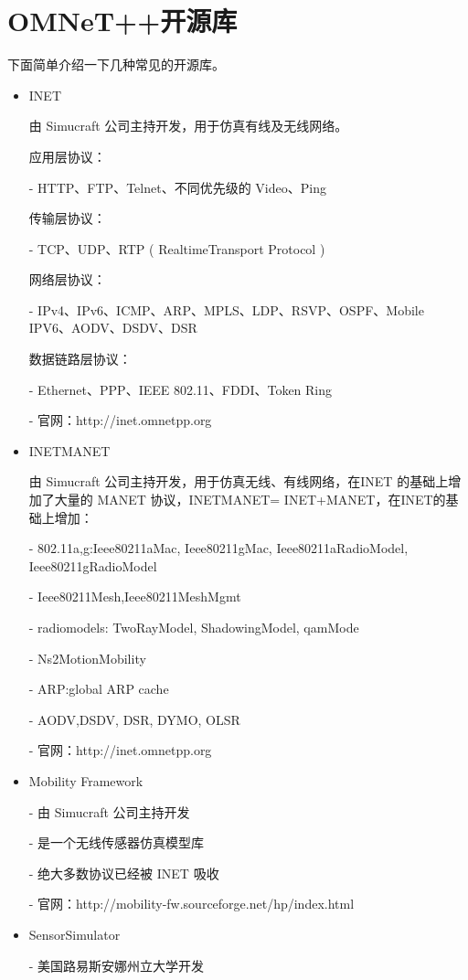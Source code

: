 \section{OMNeT++开源库}

下面简单介绍一下几种常见的开源库。


\begin{itemize}
\item INET

由 Simucraft 公司主持开发，用于仿真有线及无线网络。

应用层协议：

- HTTP、FTP、Telnet、不同优先级的 Video、Ping

传输层协议：

- TCP、UDP、RTP ( RealtimeTransport Protocol )

网络层协议：

- IPv4、IPv6、ICMP、ARP、MPLS、LDP、RSVP、OSPF、Mobile IPV6、AODV、DSDV、DSR

数据链路层协议：

- Ethernet、PPP、IEEE 802.11、FDDI、Token Ring

- 官网：http://inet.omnetpp.org

\item INETMANET

由 Simucraft 公司主持开发，用于仿真无线、有线网络，在INET 的基础上增加了大量的 MANET 协议，INETMANET= INET+MANET，在INET的基础上增加：

- 802.11a,g:Ieee80211aMac, Ieee80211gMac, Ieee80211aRadioModel, Ieee80211gRadioModel

- Ieee80211Mesh,Ieee80211MeshMgmt

- radiomodels: TwoRayModel, ShadowingModel, qamMode

- Ns2MotionMobility

- ARP:global ARP cache

- AODV,DSDV, DSR, DYMO, OLSR

- 官网：http://inet.omnetpp.org

\item Mobility Framework

- 由 Simucraft 公司主持开发

- 是一个无线传感器仿真模型库

- 绝大多数协议已经被 INET 吸收

- 官网：http://mobility-fw.sourceforge.net/hp/index.html

\item SensorSimulator

- 美国路易斯安娜州立大学开发


\end{itemize}
